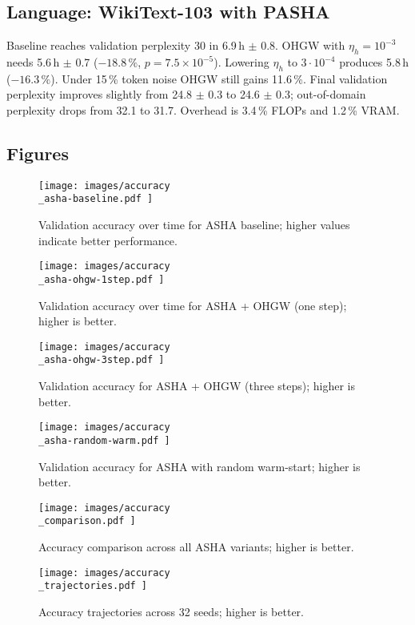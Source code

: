 \documentclass{article}
\begin{document}
\subsection{Language: WikiText-103 with PASHA}
Baseline reaches validation perplexity 30 in 6.9\,h $\pm$ 0.8. OHGW with \(\eta_h = 10^{-3}\) needs 5.6\,h $\pm$ 0.7 ($-18.8\,\%$, \(p = 7.5 \times 10^{-5}\)). Lowering \(\eta_h\) to \(3\cdot 10^{-4}\) produces 5.8\,h ($-16.3\,\%$). Under 15\,\% token noise OHGW still gains 11.6\,\%. Final validation perplexity improves slightly from 24.8 $\pm$ 0.3 to 24.6 $\pm$ 0.3; out-of-domain perplexity drops from 32.1 to 31.7. Overhead is 3.4\,\% FLOPs and 1.2\,\% VRAM\@.

\subsection{Figures}
\begin{figure}[H]
  \centering
  \texttt{[image:  images/accuracy\\\_asha-baseline.pdf ]}
  \caption{Validation accuracy over time for ASHA baseline; higher values indicate better performance.}
\end{figure}

\begin{figure}[H]
  \centering
  \texttt{[image:  images/accuracy\\\_asha-ohgw-1step.pdf ]}
  \caption{Validation accuracy over time for ASHA + OHGW (one step); higher is better.}
\end{figure}

\begin{figure}[H]
  \centering
  \texttt{[image:  images/accuracy\\\_asha-ohgw-3step.pdf ]}
  \caption{Validation accuracy for ASHA + OHGW (three steps); higher is better.}
\end{figure}

\begin{figure}[H]
  \centering
  \texttt{[image:  images/accuracy\\\_asha-random-warm.pdf ]}
  \caption{Validation accuracy for ASHA with random warm-start; higher is better.}
\end{figure}

\begin{figure}[H]
  \centering
  \texttt{[image:  images/accuracy\\\_comparison.pdf ]}
  \caption{Accuracy comparison across all ASHA variants; higher is better.}
\end{figure}

\begin{figure}[H]
  \centering
  \texttt{[image:  images/accuracy\\\_trajectories.pdf ]}
  \caption{Accuracy trajectories across 32 seeds; higher is better.}
\end{figure}
\end{document}
